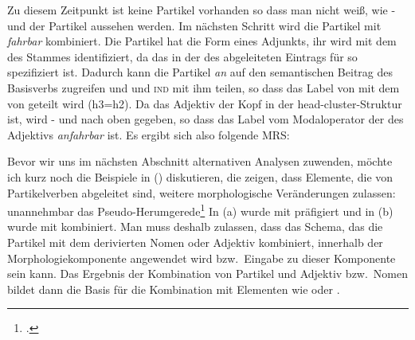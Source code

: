 Zu diesem Zeitpunkt ist keine Partikel vorhanden so dass man nicht weiß, wie \ltop- und \indw der
Partikel aussehen werden. Im nächsten Schritt wird die Partikel mit \emph{fahrbar} kombiniert.
Die Partikel hat die Form eines Adjunkts, ihr \modw wird mit dem \synsemw
des Stammes  identifiziert, da das in der \compsl des abgeleiteten
Eintrags für   so spezifiziert ist.
Dadurch kann die Partikel \emph{an} auf den semantischen Beitrag des Basisverbs  zugreifen
und \ltopw und \textsc{ind} mit ihm teilen, so dass das Label von  mit dem
von  geteilt wird (h3=h2). Da das Adjektiv der Kopf in der head-cluster-Struktur
ist, wird \ltop- und \indw nach oben gegeben, so dass das Label vom Modaloperator der \ltopw des
Adjektivs \emph{anfahrbar} ist. Es ergibt sich also folgende MRS:
\ea
{}
\z
\iw{\bars|)}

Bevor wir uns im nächsten Abschnitt alternativen Analysen zuwenden, möchte
ich kurz noch die Beispiele in () diskutieren, die zeigen, dass Elemente, die von Partikelverben
abgeleitet sind, weitere morphologische Veränderungen zulassen:
\eal
\label{pvs-in-morphology}
\ex 
unannehmbar
\ex 
das Pseudo-Herumgerede\footnote{
        .%
    }
\zl
In (a) wurde  mit  präfigiert und in (b) wurde
 mit  kombiniert. Man muss deshalb zulassen,
dass das Schema, das die Partikel mit dem derivierten Nomen oder Adjektiv kombiniert,
innerhalb der Morphologiekomponente angewendet wird bzw.\ Eingabe zu dieser Komponente sein
kann. 
Das Ergebnis der
Kombination von Partikel und Adjektiv bzw.\ Nomen 
bildet dann die Basis für die
Kombination mit Elementen wie  oder .
\begin{comment}
The combination of particle and verbal stem in the morphological component is also needed
for compounds like those in (\mex{1}):\footnote{
        See \citew[\page 55]{Groos89a} for similar Dutch\il{Dutch} examples.
}
\eal
\ex 
\gll Einschreibformular\\
     in.write.form\\
\glt `registration form'
\ex  
\gll Einwickelpapier\\
     in.wrap.paper\\
\glt `wrapping paper'
\zl
\end{comment}
%
%




